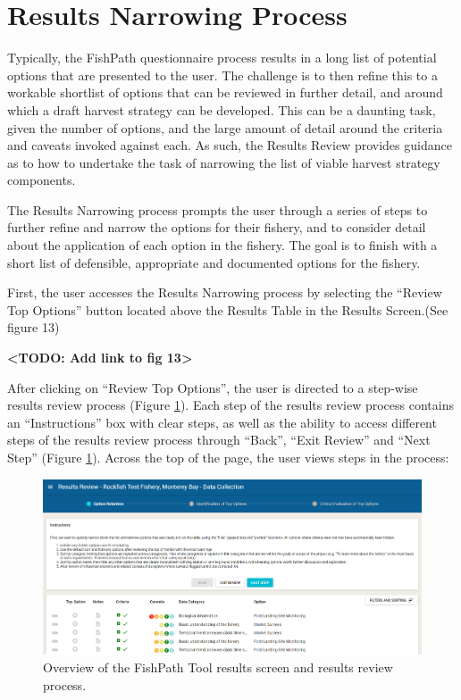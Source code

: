 \documentclass[11pt,]{book}
\begin{document}
\hypertarget{results-narrowing-process}{%
\section{Results Narrowing Process}\label{results-narrowing-process}}

Typically, the FishPath questionnaire process results in a long list of potential options that are presented to the user. The challenge is to then refine this to a workable shortlist of options that can be reviewed in further detail, and around which a draft harvest strategy can be developed. This can be a daunting task, given the number of options, and the large amount of detail around the criteria and caveats invoked against each. As such, the Results Review provides guidance as to how to undertake the task of narrowing the list of viable harvest strategy components.

The Results Narrowing process prompts the user through a series of steps to further refine and narrow the options for their fishery, and to consider detail about the application of each option in the fishery. The goal is to finish with a short list of defensible, appropriate and documented options for the fishery.

First, the user accesses the Results Narrowing process by selecting the ``Review Top Options'' button located above the Results Table in the Results Screen.(See figure 13)

\textbf{\textless TODO: Add link to fig 13\textgreater{}}

After clicking on ``Review Top Options'', the user is directed to a step-wise results review process (Figure \ref{fig:results-review}). Each step of the results review process contains an ``Instructions'' box with clear steps, as well as the ability to access different steps of the results review process through ``Back'', ``Exit Review'' and ``Next Step'' (Figure \ref{fig:results-review}). Across the top of the page, the user views steps in the process:

\begin{figure}

{\centering \includegraphics[width=0.95\linewidth]{images/results-review} 

}

\caption{Overview of the FishPath Tool results screen and results review process.}\label{fig:results-review}
\end{figure}
\end{document}

